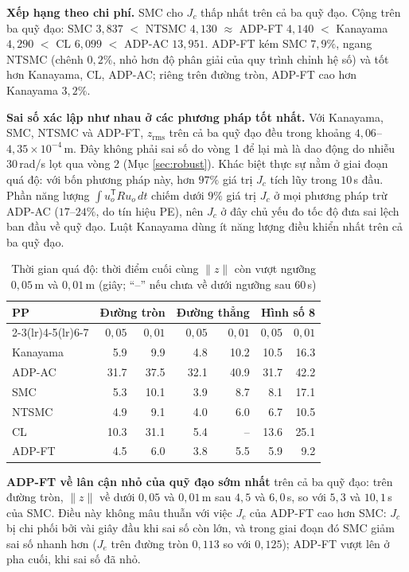 \documentclass[12pt,a4paper]{article}
\newcommand{\T}{\mathsf{T}}
\begin{document}
\textbf{Xếp hạng theo chi phí.} SMC cho $J_c$ thấp nhất trên cả ba quỹ đạo. Cộng trên ba quỹ đạo: SMC $3{,}837$ $<$ NTSMC $4{,}130$ $\approx$ ADP-FT $4{,}140$ $<$ Kanayama $4{,}290$ $<$ CL $6{,}099$ $<$ ADP-AC $13{,}951$. ADP-FT kém SMC $7{,}9\%$, ngang NTSMC (chênh $0{,}2\%$, nhỏ hơn độ phân giải của quy trình chỉnh hệ số) và tốt hơn Kanayama, CL, ADP-AC; riêng trên đường tròn, ADP-FT cao hơn Kanayama $3{,}2\%$.

\textbf{Sai số xác lập như nhau ở các phương pháp tốt nhất.} Với Kanayama, SMC, NTSMC và ADP-FT, $z_\text{rms}$ trên cả ba quỹ đạo đều trong khoảng $4{,}06$--$4{,}35\times10^{-4}$\,m. Đây không phải sai số do vòng 1 để lại mà là dao động do nhiễu $30$\,rad/s lọt qua vòng 2 (Mục \ref{sec:robust}). Khác biệt thực sự nằm ở giai đoạn quá độ: với bốn phương pháp này, hơn $97\%$ giá trị $J_c$ tích lũy trong $10$\,s đầu. Phần năng lượng $\int u_o^\T R u_o\, dt$ chiếm dưới $9\%$ giá trị $J_c$ ở mọi phương pháp trừ ADP-AC ($17$--$24\%$, do tín hiệu PE), nên $J_c$ ở đây chủ yếu đo tốc độ đưa sai lệch ban đầu về quỹ đạo. Luật Kanayama dùng ít năng lượng điều khiển nhất trên cả ba quỹ đạo.

\begin{table}[H]
\centering
\caption{Thời gian quá độ: thời điểm cuối cùng $\|z\|$ còn vượt ngưỡng $0{,}05$\,m và $0{,}01$\,m (giây; ``--'' nếu chưa về dưới ngưỡng sau 60\,s)}
\label{tab:transient}
\begin{tabular}{lrrrrrr}
\toprule
\multirow{2}{*}{\textbf{PP}} & \multicolumn{2}{c}{\textbf{Đường tròn}} & \multicolumn{2}{c}{\textbf{Đường thẳng}} & \multicolumn{2}{c}{\textbf{Hình số 8}} \\
\cmidrule(lr){2-3}\cmidrule(lr){4-5}\cmidrule(lr){6-7}
 & $0{,}05$ & $0{,}01$ & $0{,}05$ & $0{,}01$ & $0{,}05$ & $0{,}01$ \\
\midrule
Kanayama & 5.9 & 9.9 & 4.8 & 10.2 & 10.5 & 16.3 \\
ADP-AC & 31.7 & 37.5 & 32.1 & 40.9 & 31.7 & 42.2 \\
SMC & 5.3 & 10.1 & 3.9 & 8.7 & 8.1 & 17.1 \\
NTSMC & 4.9 & 9.1 & 4.0 & 6.0 & 6.7 & 10.5 \\
CL & 10.3 & 31.1 & 5.4 & -- & 13.6 & 25.1 \\
ADP-FT & 4.5 & 6.0 & 3.8 & 5.5 & 5.9 & 9.2 \\
\bottomrule
\end{tabular}
\end{table}

\textbf{ADP-FT về lân cận nhỏ của quỹ đạo sớm nhất} trên cả ba quỹ đạo: trên đường tròn, $\|z\|$ về dưới $0{,}05$ và $0{,}01$\,m sau $4{,}5$ và $6{,}0$\,s, so với $5{,}3$ và $10{,}1$\,s của SMC. Điều này không mâu thuẫn với việc $J_c$ của ADP-FT cao hơn SMC: $J_c$ bị chi phối bởi vài giây đầu khi sai số còn lớn, và trong giai đoạn đó SMC giảm sai số nhanh hơn ($J_e$ trên đường tròn $0{,}113$ so với $0{,}125$); ADP-FT vượt lên ở pha cuối, khi sai số đã nhỏ.
\end{document}
